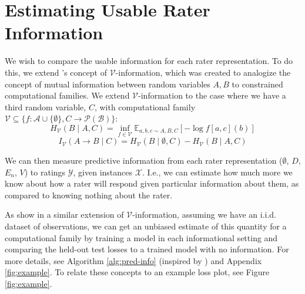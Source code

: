 \documentclass[11pt]{article}
\begin{document}
\section{Estimating Usable Rater Information}
\label{sec:informationmethodology}


We wish to compare the usable information for each rater representation. To do this, we extend \citet{xu2020theoryusableinformationcomputational}'s concept of  $\mathcal{V}$-information, which was created to analogize the concept of mutual information between random variables $A,B$ to constrained computational families. We extend $\mathcal{V}$-information to the case where we have a third random variable, $C$, with computational family $\mathcal{V} \subseteq \{f: \mathscr{A} \cup \{\emptyset\}, C \to \mathcal{P}(\mathscr{B})\}$:
\begin{equation}
H_\mathcal{V}(B \mid A, C) = \inf_{f \in \mathcal{V}} \mathbb{E}_{a,b,c \sim A,B,C} [-\log f[a,c](b)]
\end{equation}
\begin{equation}
I_\mathcal{V}(A \to B \mid C) = H_\mathcal{V}(B \mid \emptyset, C) - H_\mathcal{V}(B \mid A, C)
\end{equation}

We can then measure predictive information from each rater representation ($\emptyset$, $D$, $E_n$, $V$) to ratings $\mathcal{Y}$, given instances $\mathcal{X}$. I.e., we can estimate how much more we know about how a rater will respond given particular information about them, as compared to knowing nothing about the rater.

As \citet{ethayarajh2022understandingdatasetdifficultymathcalvusable} show in a similar extension of $\mathcal{V}$-information, assuming we have an i.i.d. dataset of observations, we can get an unbiased estimate of this quantity for a computational family by training a model in each informational setting and comparing the held-out test losses to a trained model with no information. For more details, see Algorithm \ref{alg:pred-info} (inspired by \citet{ethayarajh2022understandingdatasetdifficultymathcalvusable}) and Appendix \ref{fig:example}.
To relate these concepts to an example loss plot, see Figure \ref{fig:example}.
\end{document}

